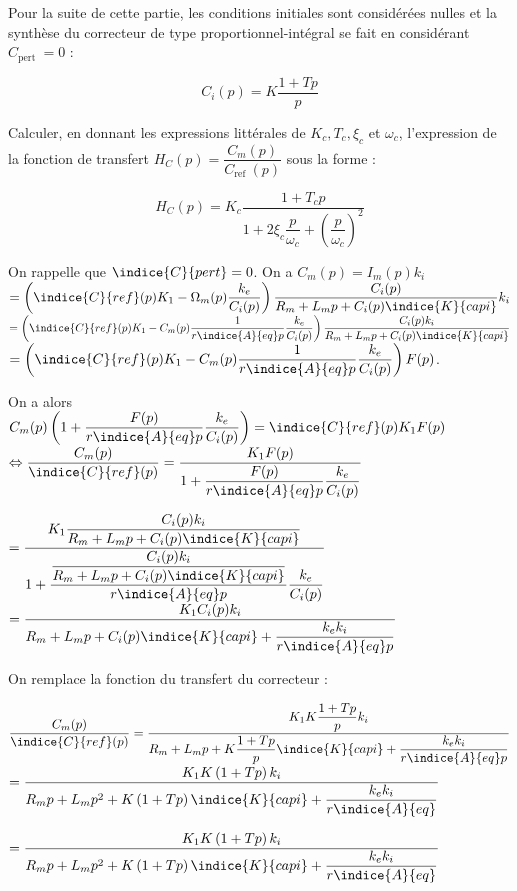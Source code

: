 Pour la suite de cette partie, les conditions initiales sont considérées nulles et la synthèse du correcteur de type proportionnel-intégral se fait en considérant $C_{\text {pert }}=0$ :

$$
C_{i}(p)=K \dfrac{1+T p}{p}
$$

\begin{question}
\label{2023_ccs_psi_q_16}
Calculer, en donnant les expressions littérales de $K_{c}, T_{c}, \xi_{c}$ et $\omega_{c}$, l'expression de la fonction de transfert $H_{C}(p)=\dfrac{C_{m}(p)}{C_{\text {ref }}(p)}$ sous la forme :

$$
H_{C}(p)=K_{c} \dfrac{1+T_{c} p}{1+2 \xi_{c} \dfrac{p}{\omega_{c}}+\left(\dfrac{p}{\omega_{c}}\right)^{2}}
$$
\end{question}
\ifprof
\begin{corrige}
On rappelle que $\indice{C}{pert} = 0$.	
On a $C_m(p) = I_m(p) k_i $ 
$=\left(\indice{C}{ref}(p)K_1- \Omega_m(p) \dfrac{k_e}{C_i(p)}\right) \dfrac{C_i(p)}{R_m + L_mp + C_i(p)\indice{K}{capi}}   k_i $ 
$=\left(\indice{C}{ref}(p)K_1- C_m(p) \dfrac{1}{r\indice{A}{eq}p}\dfrac{k_e}{C_i(p)}\right) \dfrac{C_i(p) k_i}{R_m + L_mp + C_i(p)\indice{K}{capi}} $
$=\left(\indice{C}{ref}(p)K_1- C_m(p) \dfrac{1}{r\indice{A}{eq}p}\dfrac{k_e}{C_i(p)}\right) F(p) $. 

On a alors 
$C_m(p) \left(1+\dfrac{F(p)}{r\indice{A}{eq}p}\dfrac{k_e}{C_i(p)}\right)=\indice{C}{ref}(p)K_1 F(p)$
$ \Leftrightarrow \dfrac{C_m(p) }{\indice{C}{ref}(p)} =\dfrac{K_1 F(p)}{1+\dfrac{F(p)}{r\indice{A}{eq}p}\dfrac{k_e}{C_i(p)}} $

$=\dfrac{K_1 \dfrac{C_i(p) k_i}{R_m + L_mp + C_i(p)\indice{K}{capi}}}{1+\dfrac{\dfrac{C_i(p) k_i}{R_m + L_mp + C_i(p)\indice{K}{capi}}}{r\indice{A}{eq}p}\dfrac{k_e}{C_i(p)}} $
$=\dfrac{K_1 C_i(p) k_i}{R_m + L_mp + C_i(p)\indice{K}{capi}+\dfrac{k_e k_i}{r\indice{A}{eq}p}} $

On remplace la fonction du transfert du correcteur :

$\dfrac{C_m(p) }{\indice{C}{ref}(p)}=\dfrac{K_1 K\dfrac{1+Tp}{p} k_i}{R_m + L_mp + K\dfrac{1+Tp}{p}\indice{K}{capi}+\dfrac{k_e k_i}{r\indice{A}{eq}p}} $
$=\dfrac{K_1 K\left(1+Tp\right) k_i}{R_mp + L_mp^2 + K\left(1+Tp\right)\indice{K}{capi}+\dfrac{k_e k_i}{r\indice{A}{eq}}} $

$=\dfrac{K_1 K\left(1+Tp\right) k_i}{R_mp + L_mp^2 + K\left(1+Tp\right)\indice{K}{capi}+\dfrac{k_e k_i}{r\indice{A}{eq}}} $



\end{corrige}
